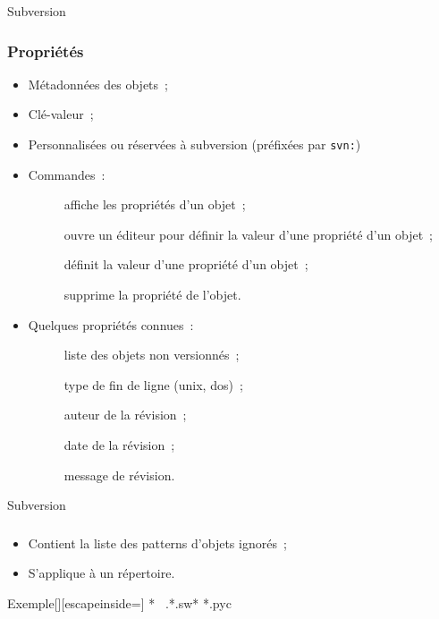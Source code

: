\begin{frame}[fragile]{Subversion}
\frametitle{Propriétés}
\begin{itemize}[<+->]
 \item Métadonnées des objets~;
 \item Clé-valeur~;
 \item Personnalisées ou réservées à subversion (préfixées par \verb/svn:/)
 \item Commandes~:
 \begin{description}
  \item [] affiche les propriétés d'un objet~;
  \item [] ouvre un éditeur pour définir la valeur d'une propriété d'un objet~;
  \item [] définit la valeur d'une propriété d'un objet~;
  \item [] supprime la propriété de l'objet.
 \end{description}
 \item Quelques propriétés connues~:
 \begin{description}
  \item [] liste des objets non versionnés~;
  \item [] type de fin de ligne (unix, dos)~;
  \item [] auteur de la révision~;
  \item [] date de la révision~;
  \item [] message de révision.
 \end{description}
\end{itemize}
\end{frame}

\begin{frame}[fragile]{Subversion}
\frametitle{}
\begin{itemize}[<+->]
 \item Contient la liste des patterns d'objets ignorés~;
 \item S'applique à un répertoire.
\end{itemize}
\begin{snvlisting}{Exemple}[][escapeinside={}]
*~
.*.sw*
*.pyc
\end{snvlisting}
\end{frame}

